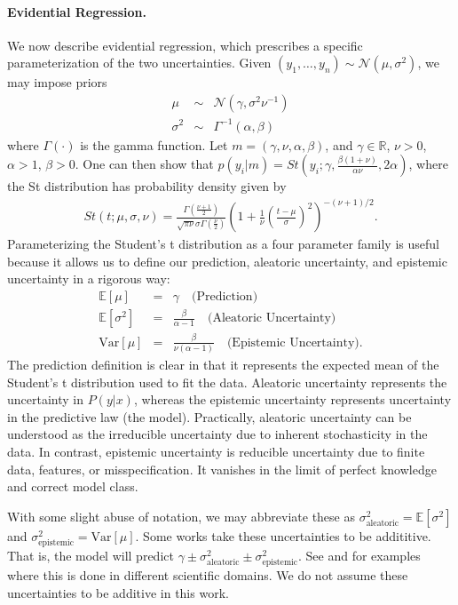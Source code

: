 \documentclass[10pt]{article} %
\theoremstyle{definition}
\begin{document}
\paragraph{Evidential Regression.} We now describe evidential regression, which prescribes a specific parameterization of the two uncertainties. Given $\left(y_1, \hdots, y_n\right) \sim \mathcal{N}(\mu, \sigma^2)$, we may impose priors
\begin{eqnarray*}
\mu & \sim & \mathcal{N}(\gamma, \sigma^2\nu^{-1})\\
\sigma^2 & \sim & \Gamma^{-1} (\alpha , \beta)
\end{eqnarray*}
%
where $\Gamma(\cdot)$ is the gamma function. Let $m = (\gamma, \nu, \alpha, \beta)$, and $\gamma \in \mathbb{R}$, $\nu > 0$, $\alpha > 1$, $\beta > 0$. One can then show that $p(y_i | m) = St(y_i ; \gamma, \frac{\beta (1 + \nu)}{\alpha \nu}, 2\alpha )$, where the St distribution has probability density given by 
%
\begin{eqnarray*}
    St(t; \mu, \sigma, \nu) = \frac{\Gamma \left(\frac{\nu + 1}{2}\right)}{\sqrt{\pi \nu}\sigma\Gamma\left(\frac{\nu}{2}\right)} \left( 1 + \frac{1}{\nu}\left(\frac{t - \mu}{\sigma}\right)^2\right)^{-(\nu + 1)/2}. \label{eq:st}
\end{eqnarray*}
%
Parameterizing the Student's t distribution as a four parameter family is useful because it allows us to define our prediction, aleatoric uncertainty, and epistemic uncertainty in a rigorous way:
%
\begin{eqnarray*}
    \mathbb{E}[\mu] &=& \gamma \quad \text{(Prediction)}\\
    \mathbb{E}[\sigma^2] &=& \frac{\beta}{\alpha - 1} \quad \text{(Aleatoric Uncertainty)} \\
    \text{Var}[\mu] &=& \frac{\beta}{\nu(\alpha - 1)} \quad \text{(Epistemic Uncertainty)}.
\end{eqnarray*}
%
The prediction definition is clear in that it represents the expected mean of the Student's t distribution used to fit the data. Aleatoric uncertainty represents the uncertainty in $P(y|x)$, whereas the epistemic uncertainty represents uncertainty in the predictive law (the model). Practically, aleatoric uncertainty can be understood as the irreducible uncertainty due to inherent stochasticity in the data. In contrast, epistemic uncertainty is reducible uncertainty due to finite data, features, or misspecification. It vanishes in the limit of perfect knowledge and correct model class. 

With some slight abuse of notation, we may abbreviate these as $\sigma^2_{\text{aleatoric}} = \mathbb{E}[\sigma^2]$ and $\sigma^2_{\text{epistemic}} = \text{Var}[\mu]$. Some works take these uncertainties to be addititive. That is, the model will predict $\gamma \pm \sigma^2_{\text{aleatoric}} \pm \sigma^2_{\text{epistemic}}$. See \cite{freedman2025status} and \cite{berman2025soft} for examples where this is done in different scientific domains. We do not assume these uncertainties to be additive in this work.
\end{document}
